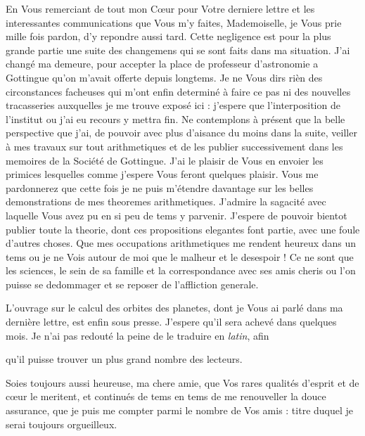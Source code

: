 \documentclass[11pt,a4paper]{article}
\begin{document}
En Vous remerciant de tout mon Cœur pour Votre derniere lettre et les
interessantes communications que Vous m'y faites, Mademoiselle, je Vous prie
mille fois pardon, d'y repondre aussi tard. Cette negligence est pour la plus
grande partie  une suite des changemens qui se sont 
faits dans ma situation. J'ai changé ma demeure, pour accepter la place de
professeur d'astronomie a Gottingue qu'on m'avait offerte depuis longtems. Je
ne Vous dirs rièn des circonstances facheuses qui m'ont enfin determiné à
faire ce pas ni des nouvelles tracasseries auxquelles je me trouve exposé ici :
j'espere que l'interposition de l'institut ou j'ai eu recours y mettra fin.
Ne contemplons à présent que la belle perspective que j'ai, de pouvoir avec
plus d'aisance du moins dans la suite,  veiller à mes travaux sur
tout arithmetiques et de les publier successivement dans les memoires de la
Société de Gottingue. J'ai le plaisir de Vous en envoier \struck{\ill{}} les
primices lesquelles comme j'espere Vous feront quelques plaisir. Vous me
pardonnerez que cette fois je ne puis m'étendre davantage sur les belles
demonstrations de mes theoremes arithmetiques. J'admire la sagacité avec
laquelle Vous avez pu en si peu de tems y parvenir. J'espere de pouvoir
bientot publier toute la theorie, dont ces propositions elegantes font partie,
avec une foule d'autres choses. Que mes occupations arithmetiques me rendent
heureux dans un tems ou je ne Vois autour de moi que le malheur et le
desespoir ! Ce ne sont que les sciences, le sein de sa famille et la
correspondance avec ses amis cheris ou l'on puisse se dedommager et se
reposer de l'affliction generale.


L'ouvrage sur le calcul des orbites des planetes, dont je Vous ai parlé dans
ma dernière lettre, est enfin sous presse. J'espere qu'il sera achevé dans
quelques mois. Je n'ai pas redouté la peine de le traduire en \emph{latin},
afin


qu'il puisse trouver un plus grand nombre des lecteurs.

Soies toujours aussi heureuse, ma chere amie, que Vos rares qualités d'esprit
et de cœur le meritent, et continués de tems en tems de me renouveller la
douce assurance, que je puis me compter parmi le nombre de Vos amis : titre
duquel je serai toujours orgueilleux.
\end{document}
